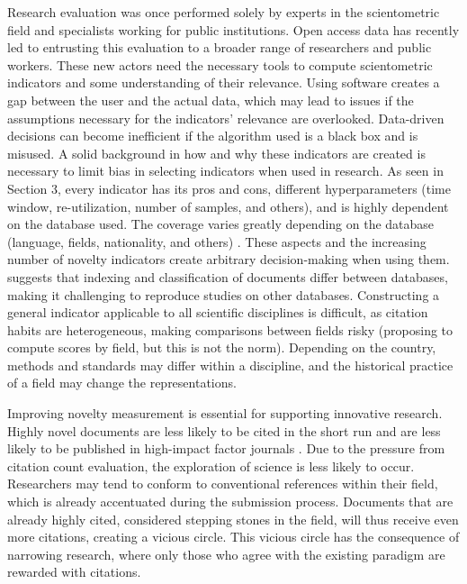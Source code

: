 Research evaluation was once performed solely by experts in the scientometric field and specialists working for public institutions. Open access data has recently led to entrusting this evaluation to a broader range of researchers and public workers. These new actors need the necessary tools to compute scientometric indicators and some understanding of their relevance. Using software creates a gap between the user and the actual data, which may lead to issues if the assumptions necessary for the indicators' relevance are overlooked. Data-driven decisions can become inefficient if the algorithm used is a black box and is misused. A solid background in how and why these indicators are created is necessary to limit bias in selecting indicators when used in research. As seen in Section 3, every indicator has its pros and cons, different hyperparameters (time window, re-utilization, number of samples, and others), and is highly dependent on the database used. The coverage varies greatly depending on the database (language, fields, nationality, and others) \citep{sugimoto2018measuring}. These aspects and the increasing number of novelty indicators create arbitrary decision-making when using them. \cite{sugimoto2018measuring} suggests that indexing and classification of documents differ between databases, making it challenging to reproduce studies on other databases. Constructing a general indicator applicable to all scientific disciplines is difficult, as citation habits are heterogeneous, making comparisons between fields risky \citep{carayol2019} (proposing to compute scores by field, but this is not the norm). Depending on the country, methods and standards may differ within a discipline, and the historical practice of a field may change the representations.

Improving novelty measurement is essential for supporting innovative research. Highly novel documents are less likely to be cited in the short run and are less likely to be published in high-impact factor journals \citep{wang2017bias, mairesse2021impact}. Due to the pressure from citation count evaluation, the exploration of science is less likely to occur. Researchers may tend to conform to conventional references within their field, which is already accentuated during the submission process. Documents that are already highly cited, considered stepping stones in the field, will thus receive even more citations, creating a vicious circle. This vicious circle has the consequence of narrowing research, where only those who agree with the existing paradigm are rewarded with citations.

